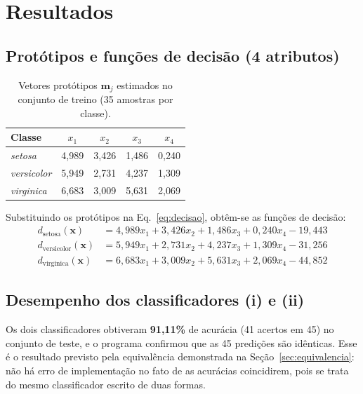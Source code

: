 \documentclass[12pt,a4paper]{article}
\begin{document}
\section{Resultados}\label{sec:resultados}

\subsection{Protótipos e funções de decisão (4 atributos)}

\begin{table}[H]
\centering
\caption{Vetores protótipos $\mathbf{m}_j$ estimados no conjunto de treino (35 amostras por classe).}
\label{tab:prototipos}
\begin{tabular}{lcccc}
\toprule
Classe & $x_1$ & $x_2$ & $x_3$ & $x_4$ \\
\midrule
\emph{setosa}     & 4,989 & 3,426 & 1,486 & 0,240 \\
\emph{versicolor} & 5,949 & 2,731 & 4,237 & 1,309 \\
\emph{virginica}  & 6,683 & 3,009 & 5,631 & 2,069 \\
\bottomrule
\end{tabular}
\end{table}

Substituindo os protótipos na Eq.~\eqref{eq:decisao}, obtêm-se as funções de decisão:
\begin{align*}
d_{\text{setosa}}(\mathbf{x})     &= 4{,}989x_1 + 3{,}426x_2 + 1{,}486x_3 + 0{,}240x_4 - 19{,}443\\
d_{\text{versicolor}}(\mathbf{x}) &= 5{,}949x_1 + 2{,}731x_2 + 4{,}237x_3 + 1{,}309x_4 - 31{,}256\\
d_{\text{virginica}}(\mathbf{x})  &= 6{,}683x_1 + 3{,}009x_2 + 5{,}631x_3 + 2{,}069x_4 - 44{,}852
\end{align*}

\subsection{Desempenho dos classificadores (i) e (ii)}

Os dois classificadores obtiveram \textbf{91,11\%} de acurácia (41 acertos em 45) no conjunto de teste, e o programa confirmou que as 45 predições são idênticas. Esse é o resultado previsto pela equivalência demonstrada na Seção~\ref{sec:equivalencia}: não há erro de implementação no fato de as acurácias coincidirem, pois se trata do mesmo classificador escrito de duas formas.
\end{document}
